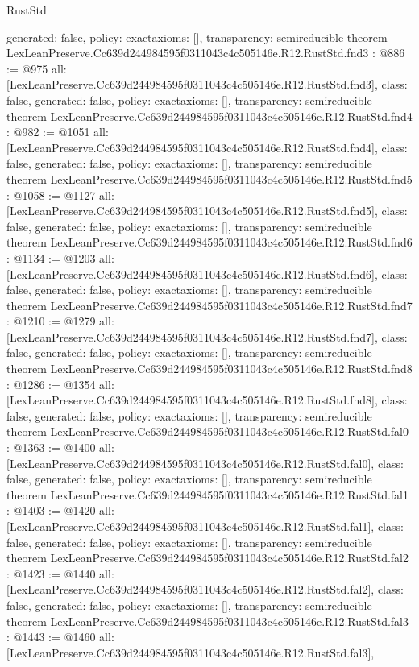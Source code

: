 \begin{lexlean}{RustStd}
\begin{coremodule}
{  generated: false,
  policy: exact{axioms: []},
  transparency: semireducible
}
theorem LexLeanPreserve.Cc639d244984595f0311043c4c505146e.R12.RustStd.fnd3 : @886 := @975 {
  all: [LexLeanPreserve.Cc639d244984595f0311043c4c505146e.R12.RustStd.fnd3],
  class: false,
  generated: false,
  policy: exact{axioms: []},
  transparency: semireducible
}
theorem LexLeanPreserve.Cc639d244984595f0311043c4c505146e.R12.RustStd.fnd4 : @982 := @1051 {
  all: [LexLeanPreserve.Cc639d244984595f0311043c4c505146e.R12.RustStd.fnd4],
  class: false,
  generated: false,
  policy: exact{axioms: []},
  transparency: semireducible
}
theorem LexLeanPreserve.Cc639d244984595f0311043c4c505146e.R12.RustStd.fnd5 : @1058 := @1127 {
  all: [LexLeanPreserve.Cc639d244984595f0311043c4c505146e.R12.RustStd.fnd5],
  class: false,
  generated: false,
  policy: exact{axioms: []},
  transparency: semireducible
}
theorem LexLeanPreserve.Cc639d244984595f0311043c4c505146e.R12.RustStd.fnd6 : @1134 := @1203 {
  all: [LexLeanPreserve.Cc639d244984595f0311043c4c505146e.R12.RustStd.fnd6],
  class: false,
  generated: false,
  policy: exact{axioms: []},
  transparency: semireducible
}
theorem LexLeanPreserve.Cc639d244984595f0311043c4c505146e.R12.RustStd.fnd7 : @1210 := @1279 {
  all: [LexLeanPreserve.Cc639d244984595f0311043c4c505146e.R12.RustStd.fnd7],
  class: false,
  generated: false,
  policy: exact{axioms: []},
  transparency: semireducible
}
theorem LexLeanPreserve.Cc639d244984595f0311043c4c505146e.R12.RustStd.fnd8 : @1286 := @1354 {
  all: [LexLeanPreserve.Cc639d244984595f0311043c4c505146e.R12.RustStd.fnd8],
  class: false,
  generated: false,
  policy: exact{axioms: []},
  transparency: semireducible
}
theorem LexLeanPreserve.Cc639d244984595f0311043c4c505146e.R12.RustStd.fal0 : @1363 := @1400 {
  all: [LexLeanPreserve.Cc639d244984595f0311043c4c505146e.R12.RustStd.fal0],
  class: false,
  generated: false,
  policy: exact{axioms: []},
  transparency: semireducible
}
theorem LexLeanPreserve.Cc639d244984595f0311043c4c505146e.R12.RustStd.fal1 : @1403 := @1420 {
  all: [LexLeanPreserve.Cc639d244984595f0311043c4c505146e.R12.RustStd.fal1],
  class: false,
  generated: false,
  policy: exact{axioms: []},
  transparency: semireducible
}
theorem LexLeanPreserve.Cc639d244984595f0311043c4c505146e.R12.RustStd.fal2 : @1423 := @1440 {
  all: [LexLeanPreserve.Cc639d244984595f0311043c4c505146e.R12.RustStd.fal2],
  class: false,
  generated: false,
  policy: exact{axioms: []},
  transparency: semireducible
}
theorem LexLeanPreserve.Cc639d244984595f0311043c4c505146e.R12.RustStd.fal3 : @1443 := @1460 {
  all: [LexLeanPreserve.Cc639d244984595f0311043c4c505146e.R12.RustStd.fal3],
}
\end{coremodule}
\end{lexlean}
